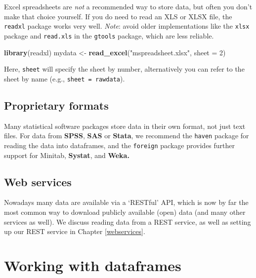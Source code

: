 \documentclass[]{book}
\newenvironment{Shaded}{\begin{snugshade}}{\end{snugshade}}
\newcommand{\DataTypeTok}[1]{\textcolor[rgb]{0.13,0.29,0.53}{#1}}
\newcommand{\DecValTok}[1]{\textcolor[rgb]{0.00,0.00,0.81}{#1}}
\newcommand{\KeywordTok}[1]{\textcolor[rgb]{0.13,0.29,0.53}{\textbf{#1}}}
\newcommand{\NormalTok}[1]{#1}
\newcommand{\StringTok}[1]{\textcolor[rgb]{0.31,0.60,0.02}{#1}}
\begin{document}
Excel spreadsheets are \emph{not} a recommended way to store data, but often you don't make that choice yourself. If you do need to read an XLS or XLSX file, the \texttt{readxl} package works very well. \emph{Note}: avoid older implementations like the \texttt{xlsx} package and \texttt{read.xls} in the \texttt{gtools} package, which are less reliable.

\begin{Shaded}
\begin{Highlighting}[]
\KeywordTok{library}\NormalTok{(readxl)}
\NormalTok{mydata <-}\StringTok{ }\KeywordTok{read_excel}\NormalTok{(}\StringTok{"mspreadsheet.xlsx"}\NormalTok{, }\DataTypeTok{sheet =} \DecValTok{2}\NormalTok{)}
\end{Highlighting}
\end{Shaded}

Here, \texttt{sheet} will specify the sheet by number, alternatively you can refer to the sheet by name (e.g., \texttt{sheet\ =\ \textquotesingle{}rawdata\textquotesingle{}}).

\hypertarget{proprietary-formats}{%
\subsection{Proprietary formats}\label{proprietary-formats}}

Many statistical software packages store data in their own format, not just text files. For data from \textbf{SPSS}, \textbf{SAS} or \textbf{Stata}, we recommend the \texttt{haven} package for reading the data into dataframes, and the \texttt{foreign} package provides further support for Minitab, \textbf{Systat}, and \textbf{Weka.}

\hypertarget{web-services}{%
\subsection{Web services}\label{web-services}}

Nowadays many data are available via a `RESTful' API, which is now by far the most common way to download publicly available (open) data (and many other services as well). We discuss reading data from a REST service, as well as setting up our REST service in Chapter \ref{webservices}.

\hypertarget{dataframes}{%
\section{Working with dataframes}\label{dataframes}}
\end{document}
